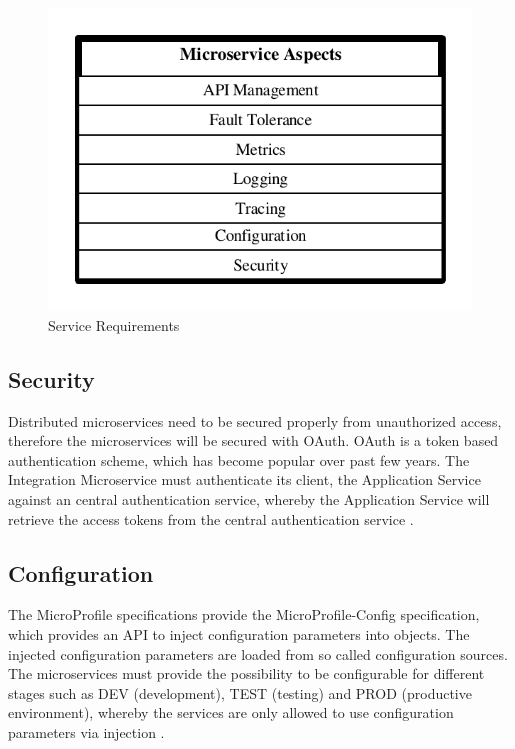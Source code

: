 \begin{figure}[htbp]
	\centering
	\includegraphics[scale=1]{images/esboc-requirement-services.pdf}
	\caption{Service Requirements}
	\label{fig:esboc-aspects}
\end{figure} 

\subsection{Security}
\label{sec:esboc-aspects-security}
Distributed microservices need to be secured properly from unauthorized access, therefore the microservices will be secured with OAuth. OAuth is a token based authentication scheme, which has become popular over past few years. The Integration Microservice must authenticate its client, the Application Service against an central authentication service, whereby the Application Service will retrieve the access tokens from the central authentication service \cite{OAuth2018}.

\subsection{Configuration}
\label{sec:esboc-aspects-config}
The MicroProfile specifications provide the MicroProfile-Config specification, which provides an API to inject configuration parameters into objects. The injected configuration parameters are loaded from so called configuration sources. The microservices must provide the possibility to be configurable for different stages such as DEV (development), TEST (testing) and PROD (productive environment), whereby  the services are only allowed to use configuration parameters via injection  \cite{EclipseMicroprofileConfig2018}.

